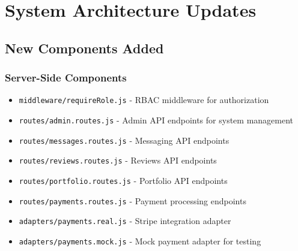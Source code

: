 \documentclass[11pt]{article}
\begin{document}
\section{System Architecture Updates}

\subsection{New Components Added}

\subsubsection{Server-Side Components}
\begin{itemize}[leftmargin=1.4em]
  \item \texttt{middleware/requireRole.js} - RBAC middleware for authorization
  \item \texttt{routes/admin.routes.js} - Admin API endpoints for system management
  \item \texttt{routes/messages.routes.js} - Messaging API endpoints
  \item \texttt{routes/reviews.routes.js} - Reviews API endpoints
  \item \texttt{routes/portfolio.routes.js} - Portfolio API endpoints
  \item \texttt{routes/payments.routes.js} - Payment processing endpoints
  \item \texttt{adapters/payments.real.js} - Stripe integration adapter
  \item \texttt{adapters/payments.mock.js} - Mock payment adapter for testing
\end{itemize}
\end{document}
